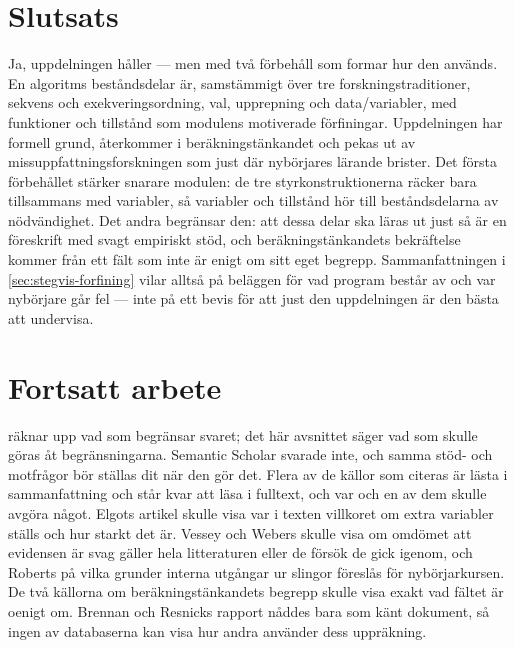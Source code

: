 \section{Slutsats}
\label{sec:sok-slutsats}

Ja, uppdelningen håller --- men med två förbehåll som formar hur den
används.  En algoritms beståndsdelar är, samstämmigt över tre
forskningstraditioner, sekvens och exekveringsordning, val, upprepning
och data/variabler, med funktioner och tillstånd som modulens motiverade
förfiningar.  Uppdelningen har formell grund\autocite{bohm1966},
återkommer i beräkningstänkandet\autocite{brennan2012} och pekas ut av
missuppfattningsforskningen som just där nybörjares lärande
brister\autocite{pea1986,qian2017,luxtonreilly2018}.  Det första
förbehållet stärker snarare modulen: de tre styrkonstruktionerna räcker
bara tillsammans med variabler\autocite{elgot1976}, så variabler och
tillstånd hör till beståndsdelarna av nödvändighet.  Det andra
begränsar den: att dessa delar ska läras ut just så är en föreskrift
med svagt empiriskt stöd\autocite{vesseyWeber1984,roberts1995}, och
beräkningstänkandets bekräftelse kommer från ett fält som inte är enigt
om sitt eget begrepp\autocite{lodiMartini2021,pears2021}.  Sammanfattningen
i \cref{sec:stegvis-forfining} vilar alltså på beläggen för vad program
består av och var nybörjare går fel --- inte på ett bevis för att just
den uppdelningen är den bästa att undervisa.

\section{Fortsatt arbete}
\label{sec:sok-fortsatt}

 räknar upp vad som begränsar svaret; det här
avsnittet säger vad som skulle göras åt begränsningarna.  Semantic
Scholar svarade inte, och samma stöd- och motfrågor bör ställas dit när
den gör det.  Flera av de källor som citeras
är lästa i sammanfattning och står kvar att läsa i fulltext, och var och
en av dem skulle avgöra något.  Elgots artikel\autocite{elgot1976}
skulle visa var i texten villkoret om extra variabler ställs och hur
starkt det är.  Vessey och Webers\autocite{vesseyWeber1984} skulle visa
om omdömet att evidensen är svag gäller hela litteraturen eller de
försök de gick igenom, och Roberts\autocite{roberts1995} på vilka
grunder interna utgångar ur slingor föreslås för nybörjarkursen.  De två
källorna om beräkningstänkandets
begrepp\autocite{lodiMartini2021,pears2021} skulle visa exakt vad fältet
är oenigt om.  Brennan och Resnicks rapport\autocite{brennan2012} nåddes
bara som känt dokument, så ingen av databaserna kan visa hur andra
använder dess uppräkning.


